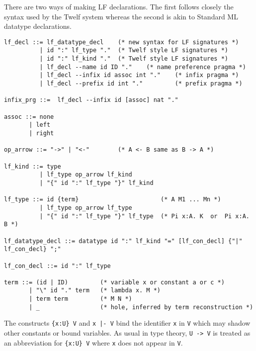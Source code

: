 \documentclass[11pt]{article}
\begin{document}
There are two ways of making LF declarations.
The first follows closely the syntax used by the Twelf system whereas the second is akin to Standard ML datatype declarations.

\begin{verbatim}
lf_decl ::= lf_datatype_decl    (* new syntax for LF signatures *)
          | id ":" lf_type "."  (* Twelf style LF signatures *)
          | id ":" lf_kind "."  (* Twelf style LF signatures *)
          | lf_decl --name id ID "."    (* name preference pragma *)
          | lf_decl --infix id assoc int "."    (* infix pragma *)
          | lf_decl --prefix id int "."         (* prefix pragma *)

infix_prg ::=  lf_decl --infix id [assoc] nat "."

assoc ::= none
       | left
       | right

op_arrow ::= "->" | "<-"        (* A <- B same as B -> A *)

lf_kind ::= type
          | lf_type op_arrow lf_kind
          | "{" id ":" lf_type "}" lf_kind

lf_type ::= id {term}                       (* A M1 ... Mn *)
          | lf_type op_arrow lf_type
          | "{" id ":" lf_type "}" lf_type  (* Pi x:A. K  or  Pi x:A. B *)

lf_datatype_decl ::= datatype id ":" lf_kind "=" [lf_con_decl] {"|" lf_con_decl} ";"

lf_con_decl ::= id ":" lf_type

term ::= (id | ID)         (* variable x or constant a or c *)
       | "\" id "." term   (* lambda x. M *)
       | term term         (* M N *)
       | _                 (* hole, inferred by term reconstruction *)
\end{verbatim}
The constructs \verb+{x:U} V+ and \verb+x |- V+ bind the identifier \verb+x+ in \verb+V+ which may shadow other constants or bound variables.
As usual in type theory, \verb+U -> V+ is treated as an abbreviation for \verb+{x:U} V+ where \verb+x+ does not appear in \verb+V+.
\end{document}
